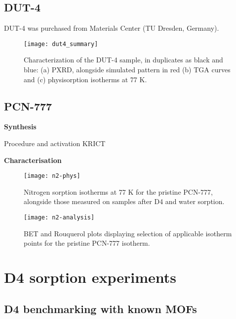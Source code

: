 \subsection{DUT-4}

DUT-4 was purchased from Materials Center (TU Dresden, Germany).

\begin{figure}[H]
    \centering
    \texttt{[image: dut4\_summary]}
    \caption{%
        Characterization of the DUT-4 sample, in duplicates as black
        and blue: (a) PXRD, alongside simulated pattern in red (b) TGA curves
        and (c)  physisorption isotherms at 77 K.
    }\label{fig:dut4-summary}
\end{figure}

\subsection{PCN-777}

\textbf{Synthesis}

Procedure and activation KRICT

\textbf{Characterisation}

\begin{figure}[H]
    \centering
    \texttt{[image: n2-phys]}
    \caption{%
        Nitrogen sorption isotherms at 77 K for the pristine
        PCN-777, alongside those measured on samples after D4 and water
        sorption.
    }\label{fig:n2-phys}
\end{figure}


\begin{figure}[H]
    \centering
    \texttt{[image: n2-analysis]}
    \caption{%
        BET and Rouquerol plots displaying selection of applicable
        isotherm points for the pristine PCN-777 isotherm.
    }\label{fig:n2-analysis}
\end{figure}



\section{D4 sorption experiments}\label{d4-sorption-experiments}

\subsection{D4 benchmarking with known MOFs}\label{d4-benchmarking-with-known-mofs}

